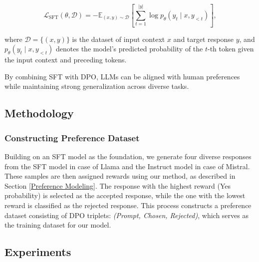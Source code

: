 \begin{equation}
\mathcal{L}_{\text{SFT}}(\theta, \mathcal{D}) = -\mathbb{E}_{(x, y) \sim \mathcal{D}} \left[ \sum_{t=1}^{|y|} \log p_\theta(y_t \mid x, y_{<t}) \right],
\end{equation}

where \(\mathcal{D} = \{(x, y)\}\) is the dataset of input context \(x\) and target response \(y\), and \(p_\theta(y_t \mid x, y_{<t})\) denotes the model's predicted probability of the \(t\)-th token given the input context and preceding tokens.

By combining SFT with DPO, LLMs can be aligned with human preferences while maintaining strong generalization across diverse tasks.



\subsection{Methodology}

\subsubsection{Constructing Preference Dataset}
\label{Pref_Dataset}
Building on an SFT model as the foundation, we generate four diverse responses from the SFT model in case of Llama and the Instruct model in case of Mistral. These samples are then assigned rewards using our method, as described in Section \ref{Preference Modeling}. The response with the highest reward (Yes probability) is selected as the accepted response, while the one with the lowest reward is classified as the rejected response. This process constructs a preference dataset consisting of DPO triplets: \textit{(Prompt, Chosen, Rejected)}, which serves as the training dataset for our model.

\subsection{Experiments}

